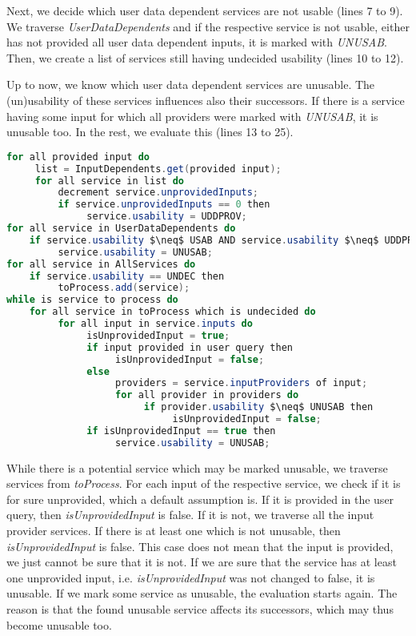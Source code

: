 \documentclass[11pt]{llncs}
\begin{document}
Next, we decide which user data dependent services are not usable (lines 7 to 9).
We traverse \emph{UserDataDependents} and if the respective service is not usable, either
has not provided all user data dependent inputs, it is marked with \emph{UNUSAB}. Then,
we create a list of services still having undecided usability (lines 10 to 12).

Up to now, we know which user data dependent services are unusable. The
(un)usability of these services influences also their successors. If there is a service
having some input for which all providers were marked with \emph{UNUSAB}, it is
unusable too. In the rest, we evaluate this (lines 13 to 25).


 
\begin{lstlisting}[language=Java,caption={\normalsize Find unusable services: Input: \emph{provided inputs}}]
for all provided input do
     list = InputDependents.get(provided input);
     for all service in list do
         decrement service.unprovidedInputs;
         if service.unprovidedInputs == 0 then
              service.usability = UDDPROV;
for all service in UserDataDependents do
    if service.usability $\neq$ USAB AND service.usability $\neq$ UDDPROV then 
         service.usability = UNUSAB;
for all service in AllServices do
    if service.usability == UNDEC then
         toProcess.add(service);
while is service to process do
    for all service in toProcess which is undecided do
         for all input in service.inputs do
              isUnprovidedInput = true;
              if input provided in user query then
                   isUnprovidedInput = false;
              else
                   providers = service.inputProviders of input;
                   for all provider in providers do
                        if provider.usability $\neq$ UNUSAB then
                             isUnprovidedInput = false;
              if isUnprovidedInput == true then
                   service.usability = UNUSAB;
\end{lstlisting} %




While there is a potential service which may be marked unusable, we traverse
services from \emph{toProcess}. For each input of the respective service, we check if it
is for sure unprovided, which a default assumption is. If it is provided in the user
query, then \emph{isUnprovidedInput} is false. If it is not, we traverse all the input provider
services. If there is at least one which is not unusable, then \emph{isUnprovidedInput} is
false. This case does not mean that the input is provided, we just cannot be sure
that it is not. If we are sure that the service has at least one unprovided input, i.e.
\emph{isUnprovidedInput} was not changed to false, it is unusable. If we mark some service
as unusable, the evaluation starts again. The reason is that the found unusable service
affects its successors, which may thus become unusable too.
\end{document}
